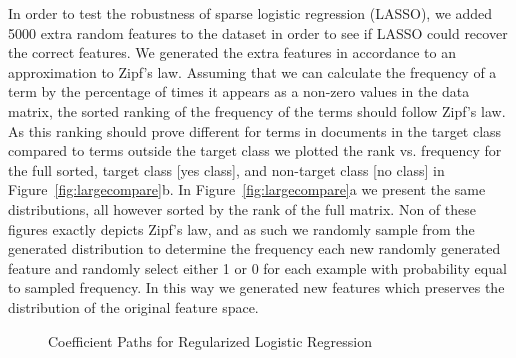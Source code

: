 In order to test the robustness of sparse logistic regression (LASSO), we added 5000 extra random features to the dataset in order to see if LASSO could recover the correct features. We generated the extra features in accordance to an approximation to Zipf's law. Assuming that we can calculate the frequency of a term by the percentage of times it appears as a non-zero values in the data matrix, the sorted ranking of the frequency of the terms should follow Zipf's law. As this ranking should prove different for terms in documents in the target class compared to terms outside the target class we plotted the rank vs. frequency for the full sorted, target class [yes class], and non-target class [no class] in Figure~\ref{fig:largecompare}b. In Figure~\ref{fig:largecompare}a we present the same distributions, all however sorted by the rank of the full matrix. Non of these figures exactly depicts Zipf's law, and as such we randomly sample from the generated distribution to determine the frequency each new randomly generated feature and randomly select either 1 or 0 for each example with probability equal to sampled frequency. In this way we generated new features which preserves the distribution of the original feature space.

\begin{figure}[!ht]
\centering
{}
\caption{Coefficient Paths for Regularized Logistic Regression}
\end{figure}


